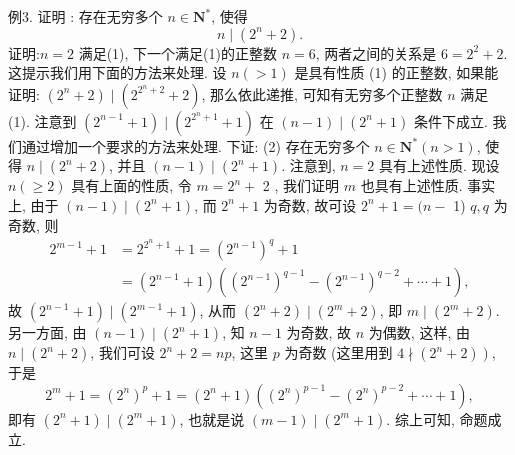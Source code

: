 例3. 证明 : 存在无穷多个 $n \in \mathbf{N}^*$, 使得
$$
n \mid\left(2^n+2\right) . \label{(1)}
$$
证明:$n=2$ 满足(1), 下一个满足(1)的正整数 $n=6$, 两者之间的关系是 $6=2^2+2$. 这提示我们用下面的方法来处理.
设 $n(>1)$ 是具有性质 (1) 的正整数, 如果能证明: $\left(2^n+2\right) \mid\left(2^{2^n+2}+2\right)$, 那么依此递推, 可知有无穷多个正整数 $n$ 满足 (1).
注意到 $\left(2^{n-1}+1\right) \mid\left(2^{2^n+1}+1\right)$ 在 $(n-1) \mid\left(2^n+1\right)$ 条件下成立.
我们通过增加一个要求的方法来处理.
下证: (2) 存在无穷多个 $n \in \mathbf{N}^*(n>1)$, 使得 $n \mid\left(2^n+2\right)$, 并且 $(n-1) \mid \left(2^n+1\right)$.
注意到, $n=2$ 具有上述性质.
现设 $n(\geqslant 2)$ 具有上面的性质, 令 $m=2^n+$ 2 , 我们证明 $m$ 也具有上述性质.
事实上, 由于 $(n-1) \mid\left(2^n+1\right)$, 而 $2^n+1$ 为奇数, 故可设 $2^n+1=(n-$ 1) $q, q$ 为奇数, 则
$$
\begin{aligned}
2^{m-1}+1 & =2^{2^n+1}+1=\left(2^{n-1}\right)^q+1 \\
& =\left(2^{n-1}+1\right)\left(\left(2^{n-1}\right)^{q-1}-\left(2^{n-1}\right)^{q-2}+\cdots+1\right),
\end{aligned}
$$
故 $\left(2^{n-1}+1\right) \mid\left(2^{m-1}+1\right)$, 从而 $\left(2^n+2\right) \mid\left(2^m+2\right)$, 即 $m \mid\left(2^m+2\right)$.
另一方面, 由 $(n-1) \mid\left(2^n+1\right)$, 知 $n-1$ 为奇数, 故 $n$ 为偶数, 这样, 由 $n \mid\left(2^n+2\right)$, 我们可设 $2^n+2=n p$, 这里 $p$ 为奇数 (这里用到 $\left.4 \nmid\left(2^n+2\right)\right)$, 于是
$$
2^m+1=\left(2^n\right)^p+1=\left(2^n+1\right)\left(\left(2^n\right)^{p-1}-\left(2^n\right)^{p-2}+\cdots+1\right),
$$
即有 $\left(2^n+1\right) \mid\left(2^m+1\right)$, 也就是说 $(m-1) \mid\left(2^m+1\right)$.
综上可知, 命题成立.




